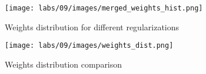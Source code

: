 \begin{figure}
    \centering
    \texttt{[image: labs/09/images/merged\_weights\_hist.png]}
        \caption{Weights distribution for different regularizations }
        \label{fig:Weights distribution for different regularizations}
\end{figure}

\begin{figure}
    \centering
    \texttt{[image: labs/09/images/weights\_dist.png]}
        \caption{Weights distribution comparison}
        \label{fig:Weights distribution comparison}
\end{figure}